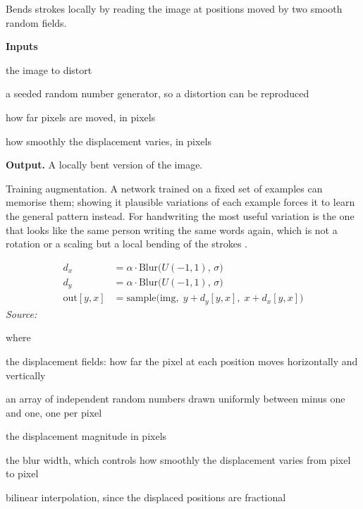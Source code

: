 Bends strokes locally by reading the image at positions moved by two smooth random fields.




\noindent\textbf{Inputs}
\begin{description}[leftmargin=2.2em,style=nextline,font=\normalfont\ttfamily]\setlength\itemsep{1pt}
  \item[{img}] \normalfont the image to distort
  \item[{rng}] \normalfont a seeded random number generator, so a distortion can be reproduced
  \item[{alpha}] \normalfont how far pixels are moved, in pixels
  \item[{sigma}] \normalfont how smoothly the displacement varies, in pixels
\end{description}

\noindent\textbf{Output.} A locally bent version of the image.


Training augmentation. A network trained on a fixed set of examples can memorise them; showing it plausible variations of each example forces it to learn the general pattern instead. For handwriting the most useful variation is the one that looks like the same person writing the same words again, which is not a rotation or a scaling but a local bending of the strokes \cite{simard2003}.



\begin{equation}
\begin{aligned}d_x &= \alpha \cdot \mathrm{Blur}\big(U(-1,1),\, \sigma\big) \\d_y &= \alpha \cdot \mathrm{Blur}\big(U(-1,1),\, \sigma\big) \\\mathrm{out}[y,x] &= \mathrm{sample}\big(\mathrm{img},\; y + d_y[y,x],\; x + d_x[y,x]\big)\end{aligned}
\end{equation}
\noindent\emph{Source: }\cite{simard2003}


\noindent where
\begin{description}[leftmargin=2.4em,style=nextline,font=\normalfont\ttfamily]\setlength\itemsep{1pt}
  \item[{$d_x,\, d_y$}] \normalfont the displacement fields: how far the pixel at each position moves horizontally and vertically
  \item[{$U(-1,1)$}] \normalfont an array of independent random numbers drawn uniformly between minus one and one, one per pixel
  \item[{$\alpha$}] \normalfont the displacement magnitude in pixels
  \item[{$\sigma$}] \normalfont the blur width, which controls how smoothly the displacement varies from pixel to pixel
  \item[{$\mathrm{sample}$}] \normalfont bilinear interpolation, since the displaced positions are fractional
\end{description}

